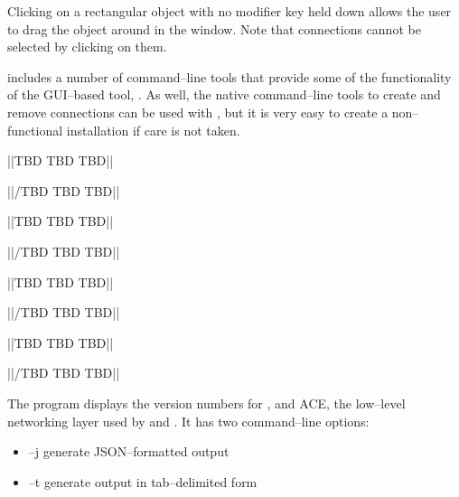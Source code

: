 Clicking on a rectangular object with no modifier key held down allows the user to drag
the object around in the window.
Note that connections cannot be selected by clicking on them.


\secondaryEnd{}


\mplusm{} includes a number of command--line tools that provide some of the functionality
of the GUI--based tool, .
As well, the native \yarp{} command--line tools to create and remove connections can be
used with \mplusm{}, but it is very easy to create a non--functional installation if care
is not taken.


			||TBD TBD TBD||

			||/TBD TBD TBD||



			||TBD TBD TBD||

			||/TBD TBD TBD||



			||TBD TBD TBD||

			||/TBD TBD TBD||



			||TBD TBD TBD||

			||/TBD TBD TBD||



The program  displays the version numbers for \mplusm{}, \yarp{}
and ACE, the low--level networking layer used by \mplusm{} and \yarp{}.
It has two command--line options:
\begin{itemize}
\item --j generate JSON--formatted output
\item --t generate output in tab--delimited form
\end{itemize}

